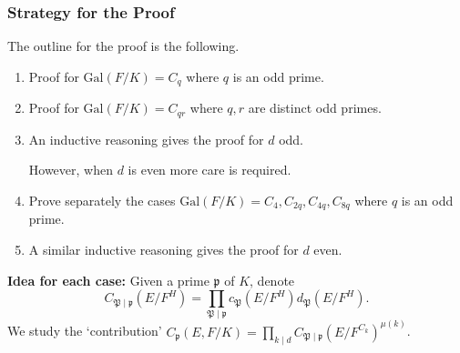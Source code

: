 \documentclass{beamer}
\newcommand{\Gal}{\mathrm{Gal}}
\newcommand{\PP}{\mathfrak{P}}
\newcommand{\QQ}{\mathbb{Q}}
\newcommand{\pp}{\mathfrak{p}}
\theoremstyle{plain}
\begin{document}
\fi

\begin{frame}
    \frametitle{Strategy for the Proof}
    The outline for the proof is the following.
    \begin{enumerate}
        \item Proof for $\Gal(F/K)=C_{q}$ where $q$ is an odd prime. \pause
        \item Proof for $\Gal(F/K)=C_{qr}$ where $q,r$ are distinct odd primes. \pause
        \item An inductive reasoning gives the proof for $d$ odd. \pause
        \vspace{0.1cm}

        However, when $d$ is even more care is required.
        \item Prove separately the cases $\Gal(F/K)=C_4, C_{2q}, C_{4q}, C_{8q}$ where $q$ is an odd prime. \pause
        \item A similar inductive reasoning gives the proof for $d$ even. \pause
    \end{enumerate}
    \textbf{Idea for each case:} Given a prime $\pp$ of $K$, denote $$C_{\PP\mid\pp}(E/F^H)=\prod_{\PP\mid\pp}c_\PP(E/F^H)d_\PP(E/F^H).$$
    \pause We study the `contribution' $C_\pp(E,F/K)=\prod_{k\mid d}C_{\PP\mid\pp}(E/F^{C_k})^{\mu(k)}$.
\end{frame}

\end{document}
